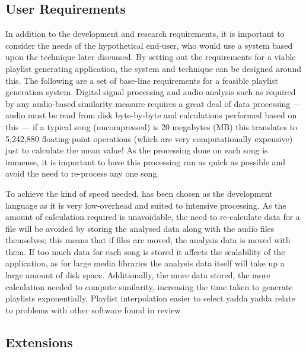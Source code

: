 \subsection{User Requirements}
In addition to the development and research requirements, it is important to consider the needs of the hypothetical end-user, who would use a system based upon the technique later discussed. By setting out the requirements for a viable playlist generating application, the system and technique can be designed around this. The following are a set of base-line requirements for a feasible playlist generation system.
Digital signal processing and audio analysis such as required by any audio-based similarity measure requires a great deal of data processing --- audio must be read from disk byte-by-byte and calculations performed based on this --- if a typical song (uncompressed) is 20 megabytes (MB) this translates to 5,242,880 floating-point operations (which are very computationally expensive) just to calculate the mean value! As the processing done on each song is immense, it is important to have this processing run as quick as possible and avoid the need to re-process any one song.

To achieve the kind of speed needed,  has been chosen as the development language as it is very low-overhead and suited to intensive processing. As the amount of calculation required is unavoidable, the need to re-calculate data for a file will be avoided by storing the analysed data along with the audio files themselves; this means that if files are moved, the analysis data is moved with them.
\label{text:spec:requirement:data}
If too much data for each song is stored it affects the scalability of the application, as for large media libraries the analysis data itself will take up a large amount of disk space. Additionally, the more data stored, the more calculation needed to compute similarity, increasing the time taken to generate playlists exponentially.
Playlist interpolation easier to select yadda yadda 
relate to problems with other software found in review
\subsection{Extensions}
